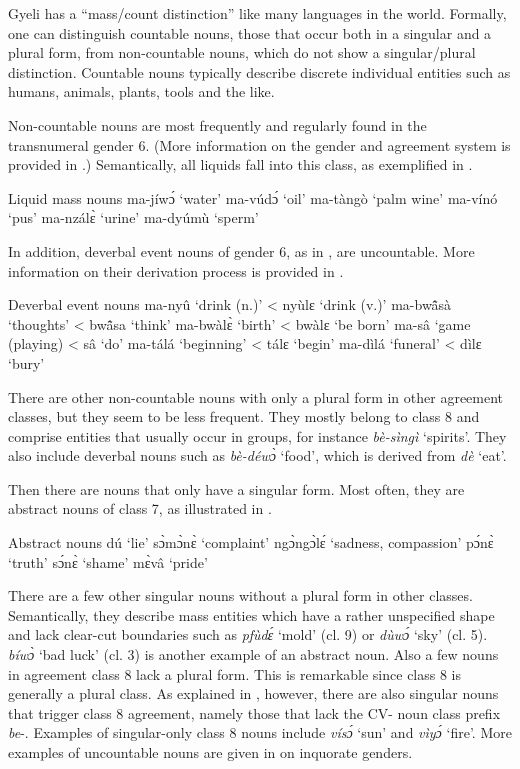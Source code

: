Gyeli has a ``mass/count distinction'' like many languages in the world. Formally, one can distinguish countable nouns, those that occur both in a singular and a plural form, from non-countable nouns, which do not show a singular/plural distinction. Countable nouns typically describe discrete individual entities such as humans, animals, plants, tools and the like. 

Non-countable nouns are most frequently and regularly found in the transnumeral gender 6. (More information on the gender and agreement system is provided in .) Semantically, all liquids fall into this class, as exemplified in .

\ea \label{LMN} Liquid mass nouns
  \ea  ma-jíwɔ́ `water'
\ex ma-vúdɔ́ `oil'
\ex ma-tàngò `palm wine'
\ex ma-vínó `pus'
\ex ma-nzálɛ̀ `urine'
\ex ma-dyúmù `sperm' 
\z
\z

\noindent In addition, deverbal event nouns of gender 6, as in , are uncountable. More information on their derivation process is provided in .

\ea \label{DEN} Deverbal event nouns
  \ea  ma-nyû `drink (n.)' <  nyùlɛ `drink (v.)'
\ex ma-bwã̂sà `thoughts' < bwã̂sa `think' 
\ex ma-bwàlɛ̀ `birth' <  bwàlɛ `be born'
\ex ma-sâ `game (playing) < sâ `do'
\ex ma-tálá `beginning' <  tálɛ `begin'
\ex ma-dìlá `funeral' <  dìlɛ `bury'
\z
\z

There are other non-countable nouns with only a plural form in other agreement classes, but they seem to be less frequent. They mostly belong to class 8 and comprise entities that usually occur in groups, for instance {\itshape bè-sìngì} `spirits'. They also include deverbal nouns such as {\itshape bè-déwɔ̀} `food', which is derived from {\itshape dè} `eat'.

Then there are nouns that only have a singular form. Most often, they are abstract nouns of class 7, as illustrated in .

\ea \label{AN} Abstract nouns
  \ea  dú `lie'
\ex sɔ̀mɔ̀nɛ̀ `complaint'
\ex ngɔ̀ngɔ̀lɛ́ `sadness, compassion'
\ex pɔ́nɛ̀ `truth'
\ex sɔ́nɛ̀ `shame'
\ex mɛ̀vâ `pride'
\z
\z

There are a few other singular nouns without a plural form in other classes. Semantically, they describe mass entities which have a rather unspecified shape and lack clear-cut boundaries such as {\itshape pfùdɛ́} `mold' (cl. 9) or {\itshape dùwɔ́} `sky' (cl. 5). {\itshape bíwɔ̀} `bad luck' (cl. 3) is another example of an abstract noun. 
Also a few nouns in agreement class 8 lack a plural form. This is remarkable since class 8 is generally a plural class. As explained in , however, there are also singular nouns that trigger class 8 agreement, namely those that lack the CV- noun class prefix {\itshape be}-.  Examples of singular-only class 8 nouns include {\itshape vísɔ́} `sun' and {\itshape vìyɔ́} `fire'.  More examples of uncountable nouns are given in  on inquorate genders.

